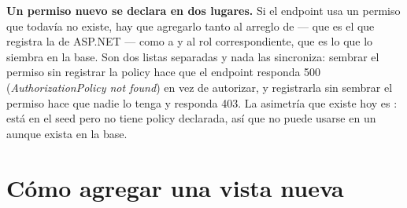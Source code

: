 \textbf{Un permiso nuevo se declara en dos lugares.} Si el endpoint usa un permiso que todavía no existe, hay que agregarlo tanto al arreglo \allowbreak {} de  --- que es el que registra la  de ASP.NET --- como a \allowbreak {} y al rol correspondiente, que es lo que lo siembra en la base. Son dos listas separadas y nada las sincroniza: sembrar el permiso sin registrar la policy hace que el endpoint responda 500 (\emph{AuthorizationPolicy not found}) en vez de autorizar, y registrarla sin sembrar el permiso hace que nadie lo tenga y responda 403. La asimetría que existe hoy es : está en el seed pero no tiene policy declarada, así que no puede usarse en un \code{[Authorize(Policy=.}\allowbreak {}\allowbreak {}\allowbreak \code{)]} aunque exista en la base.

\section{Cómo agregar una vista nueva}
\label{sec:mt-vista-nueva}

